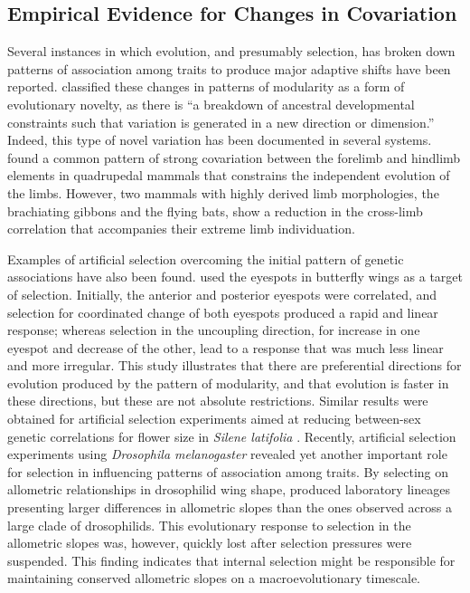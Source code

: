 \begin{refsection}
\subsection{Empirical Evidence for Changes in Covariation}

Several instances in which evolution, and presumably selection, has
broken down patterns of association among traits to produce major
adaptive shifts have been reported.
\textcite{Hallgrimsson2012-xw} classified these changes in patterns of modularity as a form of
evolutionary novelty, as there is ``a breakdown of ancestral
developmental constraints such that variation is generated in a new
direction or dimension.'' Indeed, this type of novel variation has been
documented in several systems. \textcite{Young2005-nk} found a common pattern of strong covariation
between the forelimb and hindlimb elements in quadrupedal mammals that
constrains the independent evolution of the limbs. However, two mammals
with highly derived limb morphologies, the brachiating gibbons and the
flying bats, show a reduction in the cross-limb correlation that
accompanies their extreme limb individuation.

Examples of artificial selection overcoming the initial pattern of
genetic associations have also been found. \textcite{Beldade2002-vf}
 used the
eyespots in butterfly wings as a target of selection. Initially, the
anterior and posterior eyespots were correlated, and selection for
coordinated change of both eyespots produced a rapid and linear
response; whereas selection in the uncoupling direction, for increase in
one eyespot and decrease of the other, lead to a response that was much
less linear and more irregular. This study illustrates that there are
preferential directions for evolution produced by the pattern of
modularity, and that evolution is faster in these directions, but these
are not absolute restrictions. Similar results were obtained for
artificial selection experiments aimed at reducing between-sex genetic
correlations for flower size in \emph{Silene latifolia}
\parencite{Delph2011-bc}. Recently,
artificial selection experiments using \emph{Drosophila melanogaster}
revealed yet another important role for selection in influencing
patterns of association among traits. By selecting on allometric
relationships in drosophilid wing shape,
\textcite{Bolstad2015-qr} produced
laboratory lineages presenting larger differences in allometric slopes
than the ones observed across a large clade of drosophilids. This
evolutionary response to selection in the allometric slopes was,
however, quickly lost after selection pressures were suspended. This
finding indicates that internal selection might be responsible for
maintaining conserved allometric slopes on a macroevolutionary
timescale.


\end{refsection}
